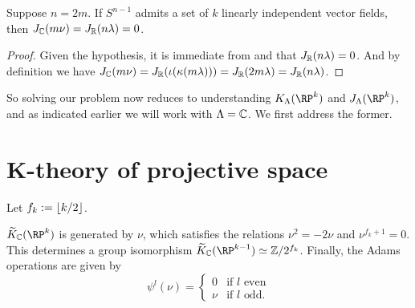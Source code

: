 \begin{lemma}
  \label{j-reduction}
  Suppose $n = 2m$. If $S^{n-1}$ admits a set of $k$ linearly
  independent vector fields, then $J_{\mathbb{C}}(m\nu) = J_{\mathbb{R}}(n\lambda) = 0$.
\end{lemma}

\begin{proof}
  Given the hypothesis, it is immediate from 
  and  that $J_{\mathbb{R}}(n\lambda) = 0$. And by
  definition we have $J_{\mathbb{C}}(m\nu) = J_{\mathbb{R}}(\iota(\kappa(m\lambda))) =
  J_{\mathbb{R}}(2m\lambda) = J_{\mathbb{R}}(n\lambda)$.
\end{proof}

So solving our problem now reduces to understanding
$K_\Lambda(\RP^k)$ and $J_\Lambda(\RP^k)$, and as indicated earlier
we will work with $\Lambda = \mathbb{C}$. We first address the former.


\section{K-theory of projective space}

\begin{notation}
  \label{kthy-order}
  Let $f_k \mathrel{:=} \lfloor k/2 \rfloor$.
\end{notation}

\begin{theorem}
  \label{RP-kthy}
  $\til K_\C(\RP^k)$ is generated by $\nu$, which satisfies the
  relations $\nu^2 = -2\nu$ and $\nu^{f_k+1} = 0$. This determines a
  group isomorphism $\til K_\C(\RP^{k-1}) \simeq \Z/2^{f_k}$.  Finally,
  the Adams operations are given by
  \[
  \psi^l(\nu) =
  \begin{cases}
    0 & \text{if }l\text{ even} \\
    \nu & \text{if }l\text{ odd}.
  \end{cases}
  \]
\end{theorem}


